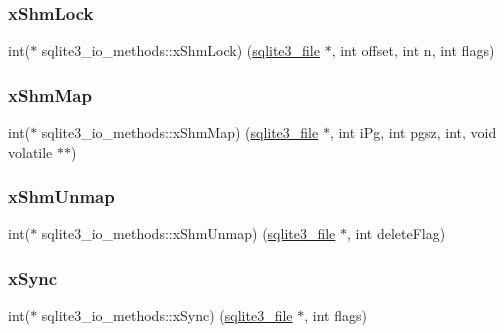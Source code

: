 \mbox{\label{structsqlite3__io__methods_a2dbd4777e8ebce36b91dd5d64aef9bbf}} 
\subsubsection{\texorpdfstring{xShmLock}{xShmLock}}
{\footnotesize\ttfamily int($\ast$ sqlite3\+\_\+io\+\_\+methods\+::x\+Shm\+Lock) (\mbox{\hyperlink{structsqlite3__file}{sqlite3\+\_\+file}} $\ast$, int offset, int n, int flags)}

\mbox{\label{structsqlite3__io__methods_a2222efe012f210417f9881103014cdc5}} 
\subsubsection{\texorpdfstring{xShmMap}{xShmMap}}
{\footnotesize\ttfamily int($\ast$ sqlite3\+\_\+io\+\_\+methods\+::x\+Shm\+Map) (\mbox{\hyperlink{structsqlite3__file}{sqlite3\+\_\+file}} $\ast$, int i\+Pg, int pgsz, int, void volatile $\ast$$\ast$)}

\mbox{\label{structsqlite3__io__methods_a494ae8bbfe91c38598c73aaa18f1848f}} 
\subsubsection{\texorpdfstring{xShmUnmap}{xShmUnmap}}
{\footnotesize\ttfamily int($\ast$ sqlite3\+\_\+io\+\_\+methods\+::x\+Shm\+Unmap) (\mbox{\hyperlink{structsqlite3__file}{sqlite3\+\_\+file}} $\ast$, int delete\+Flag)}

\mbox{\label{structsqlite3__io__methods_ad4b78f6b0b475e621fe29fb1cc886437}} 
\subsubsection{\texorpdfstring{xSync}{xSync}}
{\footnotesize\ttfamily int($\ast$ sqlite3\+\_\+io\+\_\+methods\+::x\+Sync) (\mbox{\hyperlink{structsqlite3__file}{sqlite3\+\_\+file}} $\ast$, int flags)}


